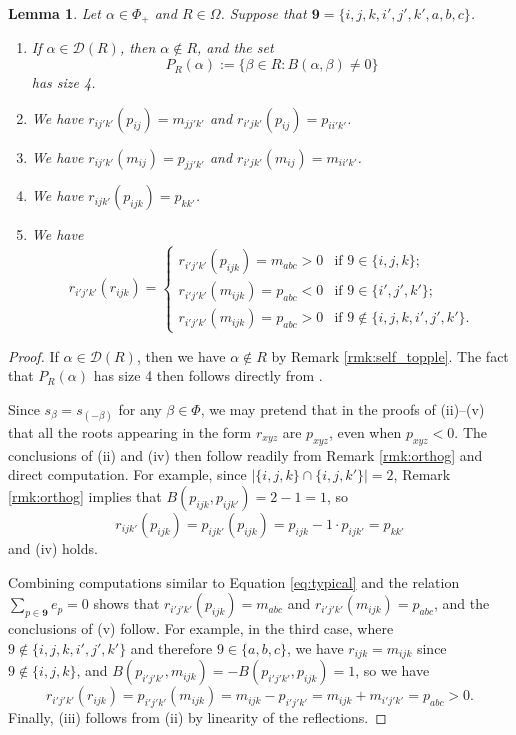 \documentclass[11pt]{amsart}
\theoremstyle{plain}
\newtheorem{lemma}[theorem]{Lemma}
\theoremstyle{definition}
\theoremstyle{remark}
\numberwithin{equation}{section}
\newcommand{\al}{\alpha}
\newcommand{\be}{\beta}
\newcommand{\res}{\mathscr{D}}
\newcommand{\nine}{\mathbf{9}}
\newcommand{\ob}{\Omega}
\newcommand{\pra}{P_R(\al)}
\newcommand{\abs}[1]{\lvert #1 \rvert}
\begin{document}
\begin{lemma}
\label{lem:res_prep}
Let $\al\in \Phi_+$ and $R\in \ob$.
Suppose that $\nine=\{i,j,k,i',j',k',a,b,c\}$.
\begin{enumerate}
\item If $\al\in \res(R)$, then $\al\notin R$, and the set
  \[
    \pra:=\{\beta\in R: B(\al,\beta)\neq 0\}
  \]
  has size 4.  
\item We have $r_{ij'k'}(p_{ij})=m_{jj'k'}$ and $r_{i'jk'}(p_{ij})=p_{ii'k'}$.
\item We have $r_{ij'k'}(m_{ij})=p_{jj'k'}$ and $r_{i'jk'}(m_{ij})=m_{ii'k'}$.
\item We have $r_{ijk'}(p_{ijk})=p_{kk'}$.
\item We have 
  \[
    r_{i'j'k'}(r_{ijk})= 
  \begin{cases} 
    r_{i'j'k'}(p_{ijk})=m_{abc}>0 & \text{if $9\in \{i,j,k\}$};\\
    r_{i'j'k'}(m_{ijk})=p_{abc}<0 & \text{if $9\in \{i',j',k'\}$};\\
    r_{i'j'k'}(m_{ijk})=p_{abc}>0 & \text{if $9\notin \{i,j,k,i',j',k'\}$}.
  \end{cases}
  \]
\end{enumerate}
\end{lemma}

\begin{proof}
  If $\al\in \res(R)$, then we have $\al\notin R$ by Remark
  \ref{rmk:self_topple}. The fact that $\pra$ has size 4 then follows directly
  from \cite[Proposition 2.1 (i)]{gx5}. 

  Since $s_\be=s_{(-\be)}$ for any $\be\in \Phi$, we may pretend that in the
  proofs of (ii)--(v) that all the roots appearing in the form $r_{xyz}$ are
  $p_{xyz}$, even when $p_{xyz}<0$. The conclusions of (ii) and (iv) then follow
  readily from Remark \ref{rmk:orthog} and direct computation. For example,
  since $\abs{\{i,j,k\}\cap\{i,j,k'\}}=2$, Remark \ref{rmk:orthog} implies that
  $B(p_{ijk},p_{ijk'})=2-1=1$, so 
  \begin{equation}
  \label{eq:typical}
    r_{ijk'}(p_{ijk})=p_{ijk'}(p_{ijk})=p_{ijk}-1\cdot p_{ijk'}=p_{kk'}
  \end{equation}
  and (iv) holds. 

  Combining computations similar to Equation \eqref{eq:typical} and the relation
  $\sum_{p\in \nine}e_p=0$ shows that $r_{i'j'k'}(p_{ijk})=m_{abc}$ and
  $r_{i'j'k'}(m_{ijk})=p_{abc}$, and the conclusions of (v) follow. For example,
  in the third case, where $9\notin \{i,j,k,i',j',k'\}$ and therefore $9\in
  \{a,b,c\}$, we have $r_{ijk}=m_{ijk}$ since $9\notin \{i,j,k\}$, and
  $B(p_{i'j'k'},m_{ijk})=-B(p_{i'j'k'},p_{ijk})=1$, so we have 
  \[
    r_{i'j'k'}(r_{ijk})=p_{i'j'k'}(m_{ijk})=m_{ijk}-p_{i'j'k'}=m_{ijk}+m_{i'j'k'}=p_{abc}>0.
  \]
  Finally, (iii) follows from (ii) by linearity of the reflections. 
\end{proof}
\end{document}
